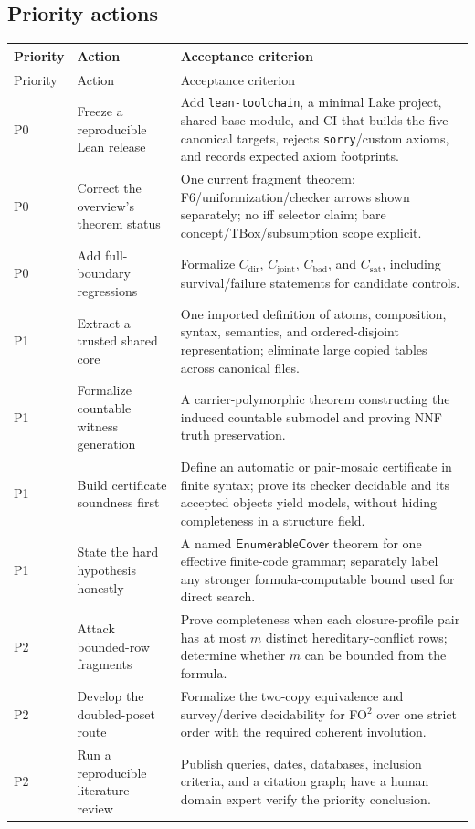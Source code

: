 \documentclass[11pt]{article}
\newcommand{\code}[1]{\texttt{#1}}
\begin{document}
\subsection{Priority actions}

\begin{longtable}{L{0.10\textwidth}L{0.29\textwidth}L{0.51\textwidth}}
\toprule
Priority & Action & Acceptance criterion \\
\midrule
\endfirsthead
\toprule
Priority & Action & Acceptance criterion \\
\midrule
\endhead
P0 & Freeze a reproducible Lean release & Add \code{lean-toolchain}, a minimal
Lake project, shared base module, and CI that builds the five canonical targets,
rejects \code{sorry}/custom axioms, and records expected axiom footprints. \\
P0 & Correct the overview's theorem status & One current fragment theorem;
F6/uniformization/checker arrows shown separately; no iff selector claim; bare
concept/TBox/subsumption scope explicit. \\
P0 & Add full-boundary regressions & Formalize \(C_{\mathrm{dir}}\),
\(C_{\mathrm{joint}}\), \(C_{\mathrm{bad}}\), and \(C_{\mathrm{sat}}\), including
survival/failure statements for candidate controls. \\
P1 & Extract a trusted shared core & One imported definition of atoms,
composition, syntax, semantics, and ordered-disjoint representation; eliminate
large copied tables across canonical files. \\
P1 & Formalize countable witness generation & A carrier-polymorphic theorem
constructing the induced countable submodel and proving NNF truth preservation. \\
P1 & Build certificate soundness first & Define an automatic or pair-mosaic
certificate in finite syntax; prove its checker decidable and its accepted
objects yield models, without hiding completeness in a structure field. \\
P1 & State the hard hypothesis honestly & A named
\(\mathsf{EnumerableCover}\) theorem for one effective finite-code grammar;
separately label any stronger formula-computable bound used for direct search. \\
P2 & Attack bounded-row fragments & Prove completeness when each closure-profile
pair has at most \(m\) distinct hereditary-conflict rows; determine whether
\(m\) can be bounded from the formula. \\
P2 & Develop the doubled-poset route & Formalize the two-copy equivalence and
survey/derive decidability for FO\(^2\) over one strict order with the required
coherent involution. \\
P2 & Run a reproducible literature review & Publish queries, dates, databases,
inclusion criteria, and a citation graph; have a human domain expert verify the
priority conclusion. \\
\bottomrule
\end{longtable}
\end{document}

